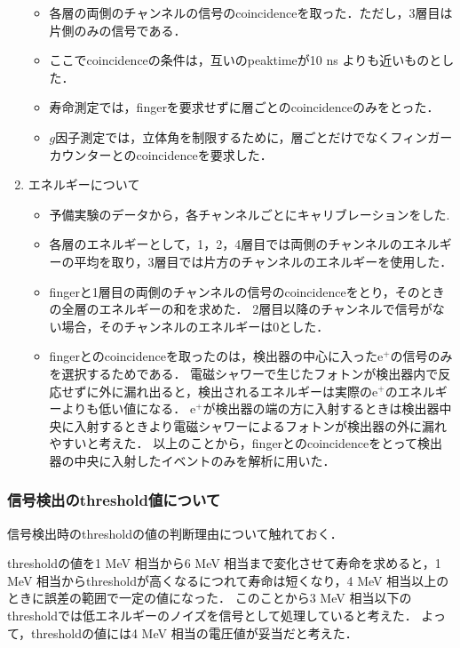 \begin{enumerate}
	 \begin{itemize}
	  \item 各層の両側のチャンネルの信号のcoincidenceを取った．ただし，3層目は片側のみの信号である．
	  \item ここでcoincidenceの条件は，互いのpeaktimeが10 ns よりも近いものとした．
	  \item 寿命測定では，fingerを要求せずに層ごとのcoincidenceのみをとった．
	  \item $g$因子測定では，立体角を制限するために，層ごとだけでなくフィンガーカウンターとのcoincidenceを要求した．
	 \end{itemize}
   \item エネルギーについて
	 \begin{itemize}
	  \item 予備実験のデータから，各チャンネルごとにキャリブレーションをした.%
	  \item 各層のエネルギーとして，1，2，4層目では両側のチャンネルのエネルギーの平均を取り，3層目では片方のチャンネルのエネルギーを使用した．
	  \item fingerと1層目の両側のチャンネルの信号のcoincidenceをとり，そのときの全層のエネルギーの和を求めた．
		2層目以降のチャンネルで信号がない場合，そのチャンネルのエネルギーは0とした．
	  \item fingerとのcoincidenceを取ったのは，検出器の中心に入ったe$^{+}$の信号のみを選択するためである．
		電磁シャワーで生じたフォトンが検出器内で反応せずに外に漏れ出ると，検出されるエネルギーは実際のe$^{+}$のエネルギーよりも低い値になる．
		e$^{+}$が検出器の端の方に入射するときは検出器中央に入射するときより電磁シャワーによるフォトンが検出器の外に漏れやすいと考えた．
		以上のことから，fingerとのcoincidenceをとって検出器の中央に入射したイベントのみを解析に用いた．
	 \end{itemize}
  \end{enumerate}
  
  \subsubsection{信号検出のthreshold値について}
  信号検出時のthresholdの値の判断理由について触れておく．
  
  thresholdの値を1 MeV 相当から6 MeV 相当まで変化させて寿命を求めると，1 MeV 相当からthresholdが高くなるにつれて寿命は短くなり，4 MeV 相当以上のときに誤差の範囲で一定の値になった．
  このことから3 MeV 相当以下のthresholdでは低エネルギーのノイズを信号として処理していると考えた．
  よって，thresholdの値には4 MeV 相当の電圧値が妥当だと考えた．

